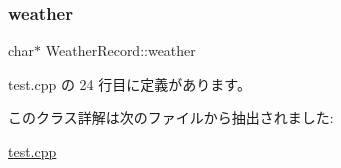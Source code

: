 \mbox{\label{class_weather_record_a3b9b2139f84c02e1ba36b1bee333e057}} 
\subsubsection{\texorpdfstring{weather}{weather}}
{\footnotesize\ttfamily char$\ast$ Weather\+Record\+::weather\hspace{0.3cm}{\ttfamily [private]}}



 test.\+cpp の 24 行目に定義があります。



このクラス詳解は次のファイルから抽出されました\+:\begin{DoxyCompactItemize}
\item 
\hyperlink{test_8cpp}{test.\+cpp}\end{DoxyCompactItemize}
